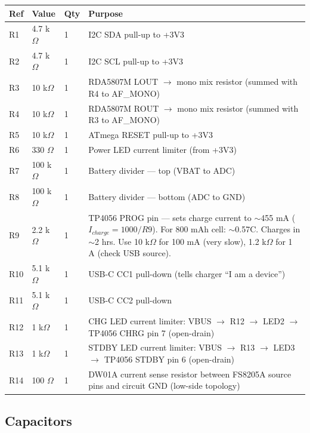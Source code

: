 \documentclass[a4paper,11pt]{article}
\renewcommand*{\,}{ }%
\begin{document}
\begin{longtable}{@{}p{1cm}p{2cm}p{1cm}p{8.5cm}@{}}
\toprule
\textbf{Ref} & \textbf{Value} & \textbf{Qty} & \textbf{Purpose} \\
\midrule
\endhead
R1 & 4.7\,k$\Omega$ & 1 & I2C SDA pull-up to +3V3 \\
R2 & 4.7\,k$\Omega$ & 1 & I2C SCL pull-up to +3V3 \\
R3 & 10\,k$\Omega$ & 1 & RDA5807M LOUT $\rightarrow$ mono mix resistor (summed with R4 to AF\_MONO) \\
R4 & 10\,k$\Omega$ & 1 & RDA5807M ROUT $\rightarrow$ mono mix resistor (summed with R3 to AF\_MONO) \\
R5 & 10\,k$\Omega$ & 1 & ATmega RESET pull-up to +3V3 \\
R6 & 330\,$\Omega$ & 1 & Power LED current limiter (from +3V3) \\
R7 & 100\,k$\Omega$ & 1 & Battery divider --- top (VBAT to ADC) \\
R8 & 100\,k$\Omega$ & 1 & Battery divider --- bottom (ADC to GND) \\
R9 & 2.2\,k$\Omega$ & 1 & TP4056 PROG pin --- sets charge current to $\sim$455\,mA ($I_{charge} = 1000/R9$). For 800\,mAh cell: $\sim$0.57C. Charges in $\sim$2\,hrs. Use 10\,k$\Omega$ for 100\,mA (very slow), 1.2\,k$\Omega$ for 1\,A (check USB source). \\
R10 & 5.1\,k$\Omega$ & 1 & USB-C CC1 pull-down (tells charger ``I am a device'') \\
R11 & 5.1\,k$\Omega$ & 1 & USB-C CC2 pull-down \\
R12 & 1\,k$\Omega$ & 1 & CHG LED current limiter: VBUS $\to$ R12 $\to$ LED2 $\to$ TP4056 CHRG pin 7 (open-drain) \\
R13 & 1\,k$\Omega$ & 1 & STDBY LED current limiter: VBUS $\to$ R13 $\to$ LED3 $\to$ TP4056 STDBY pin 6 (open-drain) \\
R14 & 100\,$\Omega$ & 1 & DW01A current sense resistor between FS8205A source pins and circuit GND (low-side topology) \\
\bottomrule
\end{longtable}

\subsection{Capacitors}
\end{document}
